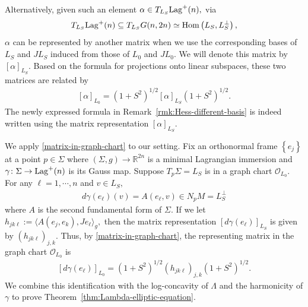 \documentclass[11pt]{amsart}
\numberwithin{equation}{section}
\theoremstyle{definition}
\theoremstyle{definition}
\newcommand{\pair}[1]{\langle #1\rangle}
\newcommand{\set}[1]{\left\{#1\right\}}
\newcommand{\pr}[1]{\left(#1\right)}
\newcommand{\bb}[1]{\mathbb{#1}} \newcommand{\td}[1]{\widetilde{#1}}
\newcommand{\sbst}{\subseteq}
\begin{document}
Alternatively, given such an element $\alpha\in T_{L_S}{\rm Lag}^+(n),$ via 
$$T_{L_S}{\rm Lag}^+(n)\sbst T_{L_S}G(n,2n)\simeq {\rm Hom}\pr{L_S,L_S^\perp},$$ 
$\alpha$ can be represented by another matrix when we use the corresponding bases of $L_S$ and $JL_S$ induced from those of $L_0$ and $JL_0.$ 
We will denote this matrix by $[\alpha]_{L_S}.$ 
Based on the formula for projections onto linear subspaces, these two matrices are related by
\begin{align}\label{matrix-in-graph-chart}
[\alpha]_{L_0}
= \pr{1+S^2}^{1/2} [\alpha]_{L_S} \pr{1+S^2}^{1/2}.
\end{align}
The newly expressed formula in Remark~\ref{rmk:Hess-different-basis} is indeed written using the matrix representation $[\alpha]_{L_S}.$


We apply \eqref{matrix-in-graph-chart} to our setting.
Fix an orthonormal frame $\set{e_j}$ at a point $p\in \Sigma$ where $(\Sigma,g)\to\bb R^{2n}$ is a minimal Lagrangian immersion and $\gamma\colon \Sigma\to {\rm Lag}^+(n)$ is its Gauss map.
Suppose $T_p\Sigma = L_S$ is in a graph chart $\mathcal O_{L_0}.$
For any $\ell=1,\cdots, n$ and $v\in L_S,$
\begin{align*}
d\gamma\pr{e_\ell}(v)
= A(e_\ell,v)\in N_pM = L_S^\perp
\end{align*}
where $A$ is the second fundamental form of $\Sigma.$
If we let $h_{jk\ell}:=\pair{A(e_j,e_k),Je_{\ell}}_g,$ then the matrix representation $[d\gamma(e_\ell)]_{L_S}$ is given by $\pr{h_{jk\ell}}_{j,k}.$
Thus, by \eqref{matrix-in-graph-chart}, the representing matrix in the graph chart $\mathcal O_{L_0}$ is
\begin{align}\label{d-gamma-ej}
[d\gamma\pr{e_\ell}]_{L_0}
= \pr{1+S^2}^{1/2} \pr{h_{jk\ell}}_{j,k} \pr{1+S^2}^{1/2}.
\end{align} 
We combine this identification with the log-concavity of $\Lambda$ and the harmonicity of $\gamma$ to prove Theorem~\ref{thm:Lambda-elliptic-equation}.
\end{document}
